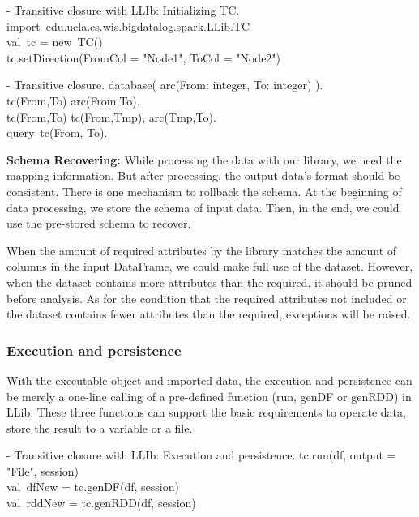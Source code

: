 \vspace{0.5em}
 - Transitive closure with LLIb:  Initializing TC.
\cldl
import\ edu.ucla.cs.wis.bigdatalog.spark.LLib.TC \\
val\ tc = new\ TC() \\

tc.setDirection(FromCol = "Node1", ToCol = "Node2")
\eldl

\vspace{0.5em}
 - Transitive closure.
\bldl
database({
	arc(From: integer, To: integer)
}).\\


tc(From,To) \leftarrow arc(From,To).\\
tc(From,To) \leftarrow tc(From,Tmp), arc(Tmp,To). \\
query\ tc(From, To).
\eldl

\textbf{Schema Recovering:} While processing the data with our library, we need the mapping information. But after processing, the output data's format should be consistent. There is one mechanism to rollback the schema. At the beginning of data processing, we store the schema of input data. Then, in the end, we could use the pre-stored schema to recover. 

When the amount of required attributes by the library matches the amount of columns in the input DataFrame, we could  make full use of the dataset. However, when the dataset contains more attributes than the required, it should be pruned before analysis. As for the condition that the required attributes not included or the dataset contains fewer attributes than  the required, exceptions will be raised.



\subsubsection{Execution and persistence}
With the executable object and imported data, the execution and persistence can be merely a one-line calling of a pre-defined function (run, genDF or genRDD) in LLib. These three functions can support the basic requirements to operate data, store the result to a variable or a file. 

\vspace{0.5em}
 - Transitive closure with LLIb:  Execution and persistence.
\bldl
tc.run(df, output = "File", session) \\
val\ dfNew = tc.genDF(df, session) \\
val\ rddNew = tc.genRDD(df, session) \\

